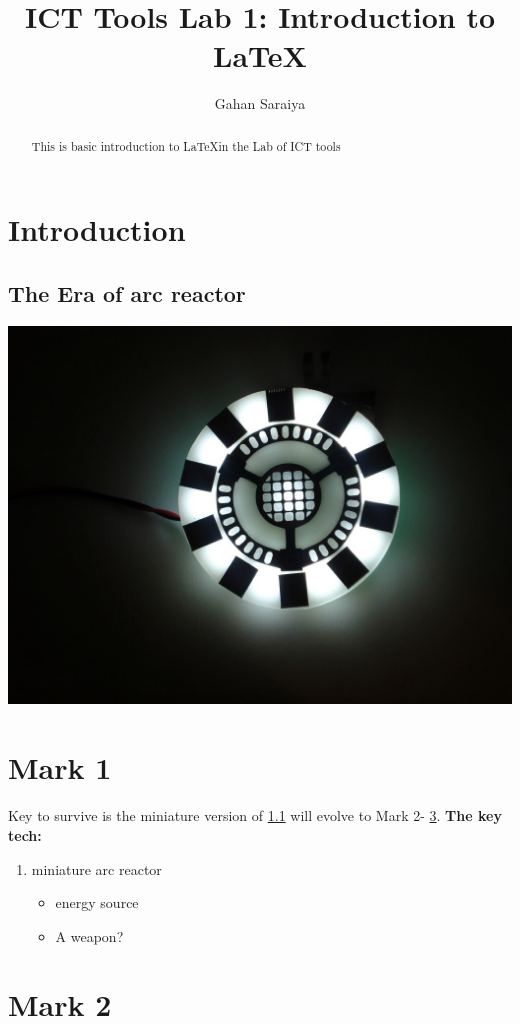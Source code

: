 \documentclass[16pt]{article}
\title{ICT Tools Lab 1: Introduction to \LaTeX}
\author{Gahan Saraiya}
\date{}
\begin{document}
\maketitle

\begin{abstract}
	This is basic introduction to \LaTeX in the Lab of ICT tools
\end{abstract}


\section{Introduction}
\label{intro}
\subsection{The Era of arc reactor}
\label{arc_reactor}
\hspace{20pt}
\includegraphics[scale=0.2]{arc_reactor.jpg}
\\
\section{Mark 1}
\label{mk1}
\paragraph{}
Key to survive is the miniature version of \ref{arc_reactor} will evolve to Mark 2- \ref{mk2}.
\newline
\textbf{The key tech:}
\begin{enumerate}
	\item miniature arc reactor
	\begin{itemize}
		\item energy source
		\item A weapon?
	\end{itemize}
\end{enumerate}

\section{Mark 2}
\label{mk2}
\end{document}
